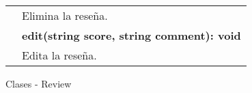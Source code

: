 \begin{clases}
\begin{tabular}{|>{\raggedright\arraybackslash}p{4cm}|p{12cm}|}
		                              & Elimina la reseña.                                                                                                                                                                                 \\
		                              & \textbf{edit(string score, string comment): void}                                                                                                                                                  \\
		                              & Edita la reseña.                                                                                                                                                                                   \\
		\hline
	\end{tabular}
	\caption{Clases - Review}
\end{clases}